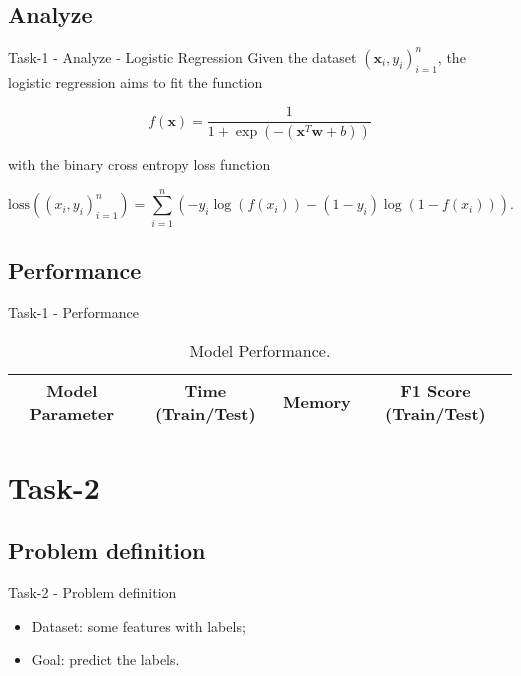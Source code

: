 \documentclass{beamer}
\begin{document}
\subsection{Analyze}

\begin{frame}{Task-1 - Analyze - Logistic Regression}
  Given the dataset ${(\mathbf{x}_i, y_i)}_{i=1}^n$, the logistic regression aims to fit the function

  $$
    f(\mathbf{x}) = \frac{1}{1 + \exp(-(\mathbf{x}^T \mathbf{w} + b))}
  $$

  with the binary cross entropy loss function

  $$
    \text{loss}\left({(x_i, y_i)}_{i=1}^n\right) = \sum_{i=1}^n \left(- y_i \log (f(x_i)) - (1 - y_i) \log (1 - f(x_i))\right).
  $$
\end{frame}

\subsection{Performance}

\begin{frame}{Task-1 - Performance}

  \begin{table}[H]
    \centering
    \begin{tabular}{|c|c|c|c|}
      \hline
      Model Parameter & Time (Train/Test) & Memory & F1 Score (Train/Test) \\
      \hline
    \end{tabular}
    \caption{Model Performance.}
  \end{table}

\end{frame}

\section{Task-2}

\subsection{Problem definition}

\begin{frame}{Task-2 - Problem definition}

  \begin{itemize}
    \item Dataset: some features with labels;
    \item Goal: predict the labels.
  \end{itemize}

\end{frame}
\end{document}
